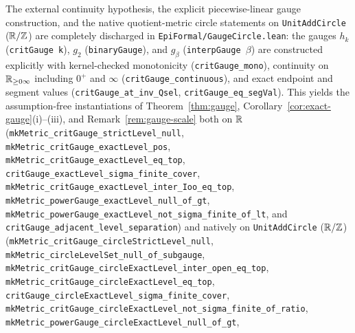The external continuity hypothesis, the explicit piecewise-linear gauge
construction, and the native quotient-metric circle statements on
\texttt{UnitAddCircle} ($\mathbb{R}/\mathbb{Z}$) are completely discharged in
\texttt{EpiFormal/\allowbreak GaugeCircle.lean}:
the gauges $h_k$ (\texttt{critGauge k}), $g_2$ (\texttt{binaryGauge}), and
$g_\beta$ (\texttt{interpGauge \ensuremath{\beta}}) are constructed explicitly
with kernel-checked monotonicity (\texttt{critGauge\_\allowbreak mono}),
continuity on $\mathbb{R}_{\ge0\infty}$ including $0^+$ and $\infty$
(\texttt{critGauge\_\allowbreak continuous}), and exact endpoint and segment
values (\texttt{critGauge\_\allowbreak at\_\allowbreak inv\_\allowbreak Qsel},
\texttt{critGauge\_\allowbreak eq\_\allowbreak segVal}).
This yields the assumption-free instantiations of Theorem~\ref{thm:gauge},
Corollary~\ref{cor:exact-gauge}(i)--(iii), and Remark~\ref{rem:gauge-scale} both
on $\mathbb{R}$
(\texttt{mkMetric\_\allowbreak critGauge\_\allowbreak strictLevel\_\allowbreak null},
\texttt{mkMetric\_\allowbreak critGauge\_\allowbreak exactLevel\_\allowbreak pos},
\texttt{mkMetric\_\allowbreak critGauge\_\allowbreak exactLevel\_\allowbreak eq\_\allowbreak top},
\texttt{critGauge\_\allowbreak exactLevel\_\allowbreak sigma\_\allowbreak finite\_\allowbreak cover},
\texttt{mkMetric\_\allowbreak critGauge\_\allowbreak exactLevel\_\allowbreak inter\_\allowbreak Ioo\_\allowbreak eq\_\allowbreak top},
\texttt{mkMetric\_\allowbreak powerGauge\_\allowbreak exactLevel\_\allowbreak null\_\allowbreak of\_\allowbreak gt},
\texttt{mkMetric\_\allowbreak powerGauge\_\allowbreak exactLevel\_\allowbreak not\_\allowbreak sigma\_\allowbreak finite\_\allowbreak of\_\allowbreak lt},
and \texttt{critGauge\_\allowbreak adjacent\_\allowbreak level\_\allowbreak separation})
and natively on \texttt{UnitAddCircle} ($\mathbb{R}/\mathbb{Z}$)
(\texttt{mkMetric\_\allowbreak critGauge\_\allowbreak circleStrictLevel\_\allowbreak null},
\texttt{mkMetric\_\allowbreak circleLevelSet\_\allowbreak null\_\allowbreak of\_\allowbreak subgauge},
\texttt{mkMetric\_\allowbreak critGauge\_\allowbreak circleExactLevel\_\allowbreak inter\_\allowbreak open\_\allowbreak eq\_\allowbreak top},
\texttt{mkMetric\_\allowbreak critGauge\_\allowbreak circleExactLevel\_\allowbreak eq\_\allowbreak top},
\texttt{critGauge\_\allowbreak circleExactLevel\_\allowbreak sigma\_\allowbreak finite\_\allowbreak cover},
\texttt{mkMetric\_\allowbreak critGauge\_\allowbreak circleExactLevel\_\allowbreak not\_\allowbreak sigma\_\allowbreak finite\_\allowbreak of\_\allowbreak ratio},
\texttt{mkMetric\_\allowbreak powerGauge\_\allowbreak circleExactLevel\_\allowbreak null\_\allowbreak of\_\allowbreak gt},
